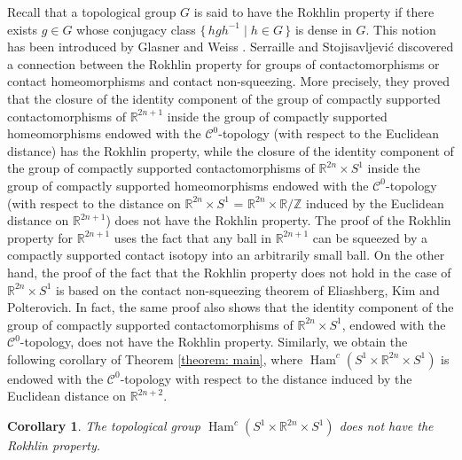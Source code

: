 \documentclass{amsart}
\newcommand{\R}{\mathbb{R}}
\DeclareMathOperator{\Ham}{Ham}
\newtheorem{cor}[thm]{Corollary}
\theoremstyle{remark}
\begin{document}
Recall that a topological group $G$
is said to have the Rokhlin property
if there exists $g \in G$
whose conjugacy class $\{\, hgh^{-1} \;\lvert\; h \in G \,\}$
is dense in $G$.
This notion has been introduced
by Glasner and Weiss \cite{GW1, GW2}.
Serraille and Stojisavljevi\'c \cite{SS}
discovered a connection
between the Rokhlin property for groups
of contactomorphisms or contact homeomorphisms
and contact non-squeezing.
More precisely,
they proved that the closure of the identity component
of the group of compactly supported contactomorphisms of $\mathbb{R}^{2n+1}$
inside the group of compactly supported homeomorphisms
endowed with the $\mathcal{C}^0$-topology
(with respect to the Euclidean distance)
has the Rokhlin property,
while the closure of the identity component
of the group of compactly supported contactomorphisms
of $\mathbb{R}^{2n} \times S^1$
inside the group of compactly supported homeomorphisms
endowed with the $\mathcal{C}^0$-topology
(with respect to the distance on
$\mathbb{R}^{2n} \times S^1$ = $\mathbb{R}^{2n} \times \mathbb{R}/\mathbb{Z}$
induced by the Euclidean distance on $\mathbb{R}^{2n+1}$)
does not have the Rokhlin property.
The proof of the Rokhlin property for $\mathbb{R}^{2n+1}$
uses the fact that any ball in $\mathbb{R}^{2n+1}$
can be squeezed by a compactly supported contact isotopy
into an arbitrarily small ball.
On the other hand,
the proof of the fact that the Rokhlin property
does not hold in the case of $\mathbb{R}^{2n} \times S^1$
is based on the contact non-squeezing theorem
of Eliashberg, Kim and Polterovich.
In fact,
the same proof also shows that 
the identity component
of the group of compactly supported contactomorphisms
of $\mathbb{R}^{2n} \times S^1$,
endowed with the $\mathcal{C}^0$-topology,
does not have the Rokhlin property.
Similarly,
we obtain the following corollary
of Theorem \ref{theorem: main},
where $\Ham^c (S^1 \times \R^{2n} \times S^1)$
is endowed with the  $\mathcal{C}^0$-topology
with respect to the distance
induced by the Euclidean distance on $\mathbb{R}^{2n+2}$.

\begin{cor}\label{corollary: Rokhlin}
The topological group  $\Ham^c (S^1 \times \R^{2n} \times S^1)$
does not have the Rokhlin property. 
\end{cor}
\end{document}
